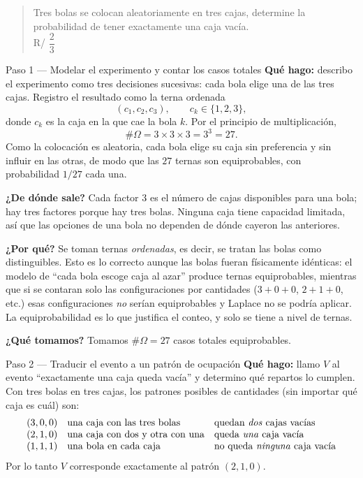 \documentclass[11pt]{article}
\begin{document}
\begin{quote}
Tres bolas se colocan aleatoriamente en tres cajas, determine la probabilidad de tener exactamente una caja vacía.\\[2pt]
\hspace*{\fill}R/ $\dfrac{2}{3}$
\end{quote}

\begin{sol}
\begin{paso}{Paso 1 --- Modelar el experimento y contar los casos totales}
\textbf{Qué hago:} describo el experimento como tres decisiones sucesivas: cada bola elige una
de las tres cajas. Registro el resultado como la terna ordenada
\[
(c_1,c_2,c_3),\qquad c_k\in\{1,2,3\},
\]
donde $c_k$ es la caja en la que cae la bola $k$. Por el principio de multiplicación,
\[
\#\Omega=3\times 3\times 3=3^{3}=27 .
\]
Como la colocación es aleatoria, cada bola elige su caja sin preferencia y sin influir en las
otras, de modo que las $27$ ternas son equiprobables, con probabilidad $1/27$ cada una.

\textbf{¿De dónde sale?} Cada factor $3$ es el número de cajas disponibles para una bola; hay
tres factores porque hay tres bolas. Ninguna caja tiene capacidad limitada, así que las
opciones de una bola no dependen de dónde cayeron las anteriores.

\textbf{¿Por qué?} Se toman ternas \emph{ordenadas}, es decir, se tratan las bolas como
distinguibles. Esto es lo correcto aunque las bolas fueran físicamente idénticas: el modelo de
``cada bola escoge caja al azar'' produce ternas equiprobables, mientras que si se contaran
solo las configuraciones por cantidades ($3+0+0$, $2+1+0$, etc.) esas configuraciones
\emph{no} serían equiprobables y Laplace no se podría aplicar. La equiprobabilidad es lo que
justifica el conteo, y solo se tiene a nivel de ternas.

\textbf{¿Qué tomamos?} Tomamos $\#\Omega=27$ casos totales equiprobables.
\end{paso}

\begin{paso}{Paso 2 --- Traducir el evento a un patrón de ocupación}
\textbf{Qué hago:} llamo $V$ al evento ``exactamente una caja queda vacía'' y determino qué
repartos lo cumplen. Con tres bolas en tres cajas, los patrones posibles de cantidades (sin
importar qué caja es cuál) son:
\[
\begin{array}{lll}
(3,0,0) & \text{una caja con las tres bolas} & \text{quedan \emph{dos} cajas vacías}\\
(2,1,0) & \text{una caja con dos y otra con una} & \text{queda \emph{una} caja vacía}\\
(1,1,1) & \text{una bola en cada caja} & \text{no queda \emph{ninguna} caja vacía}
\end{array}
\]
Por lo tanto $V$ corresponde exactamente al patrón $(2,1,0)$.


\end{paso}
\end{sol}
\end{document}
